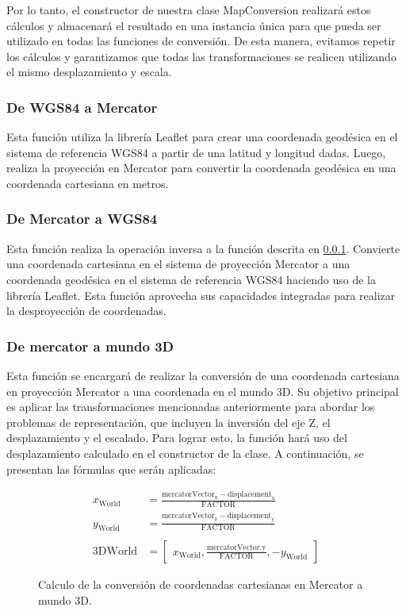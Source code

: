 \documentclass[a4paper, 11pt]{book}
\begin{document}
Por lo tanto, el constructor de nuestra clase MapConversion realizará estos cálculos y almacenará el resultado en una instancia única para que pueda ser utilizado en todas las funciones de conversión. De esta manera, evitamos repetir los cálculos y garantizamos que todas las transformaciones se realicen utilizando el mismo desplazamiento y escala.
\subsubsection{De WGS84 a Mercator}
\label{funcion:deegreeToMeter}
Esta función utiliza la librería Leaflet para crear una coordenada geodésica en el sistema de referencia WGS84 a partir de una latitud y longitud dadas. Luego, realiza la proyección en Mercator para convertir la coordenada geodésica en una coordenada cartesiana en metros.
\subsubsection{De Mercator a WGS84}
\label{funcion:meterToDegree}
Esta función realiza la operación inversa a la función descrita en \ref{funcion:deegreeToMeter}. Convierte una coordenada cartesiana en el sistema de proyección Mercator a una coordenada geodésica en el sistema de referencia WGS84 haciendo uso de la librería Leaflet. Esta función aprovecha sus capacidades integradas para realizar la desproyección de coordenadas.
\subsubsection{De mercator a mundo 3D}
\label{funcion:mercatorToWorld}
Esta función se encargará de realizar la conversión de una coordenada cartesiana en proyección Mercator a una coordenada en el mundo 3D. Su objetivo principal es aplicar las transformaciones mencionadas anteriormente para abordar los problemas de representación, que incluyen la inversión del eje Z, el desplazamiento y el escalado. Para lograr esto, la función hará uso del desplazamiento calculado en el constructor de la clase. A continuación, se presentan las fórmulas que serán aplicadas:

\begin{figure}[h]
    \begin{align*}
    x_{\text{World}} &= \frac{\mathbf{\mathrm{mercatorVector}}_{\text{x}} - \mathbf{\mathrm{displacement}}_{\text{x}}}{\mathbf{\mathrm{FACTOR}}} \\
    y_{\text{World}} &= \frac{\mathbf{\mathrm{mercatorVector}}_{\text{z}} - \mathbf{\mathrm{displacement}}_{\text{y}}}{\mathbf{\mathrm{FACTOR}}} \\\\
    \mathbf{\mathrm{3DWorld}} &= 
    \begin{bmatrix}
    x_{\text{World}}, \frac{\text{mercatorVector.y}}{\mathbf{\mathrm{FACTOR}}}, -y_{\text{World}}
    \end{bmatrix}
    \end{align*}
\caption{Calculo de la conversión de coordenadas cartesianas en Mercator a mundo 3D.}
  \label{formula:mercatorToWorld}
\end{figure}
\end{document}
